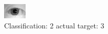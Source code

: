 \begin{figure}[h!]
\begin{center}
\includegraphics[width=0.60\columnwidth]{figures/ID1090_class_2_target_3.png}
\end{center}
\caption{ Classification: 2 actual target: 3}
\label{fig:ID1090_class_2_target_3}
\end{figure}
